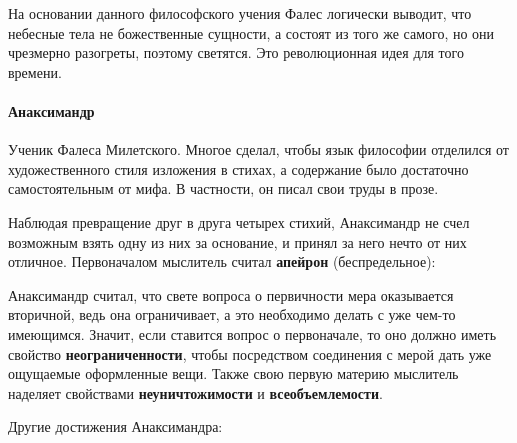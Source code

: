 На основании данного философского учения Фалес логически выводит, что небесные тела не божественные сущности, а состоят из того же самого, но они чрезмерно разогреты, поэтому светятся. Это революционная идея для того времени.



\paragraph{Анаксимандр} Ученик Фалеса Милетского.
Многое сделал, чтобы язык философии отделился от художественного стиля изложения в стихах, а содержание было достаточно самостоятельным от мифа. В частности, он писал свои труды в прозе. 

Наблюдая превращение друг в друга четырех стихий, Анаксимандр не счел возможным взять
одну из них за основание, и принял за него нечто от них отличное. Первоначалом мыслитель считал \textbf{апейрон} (беспредельное):

Анаксимандр считал, что свете вопроса о первичности мера оказывается вторичной, ведь она ограничивает, а это необходимо делать с уже чем-то имеющимся. 
Значит, если ставится вопрос о первоначале, то оно должно иметь свойство \textbf{неограниченности}, чтобы посредством соединения с мерой дать уже ощущаемые оформленные вещи. Также свою первую материю мыслитель наделяет свойствами \textbf{неуничтожимости} и \textbf{всеобъемлемости}.

Другие достижения Анаксимандра:


